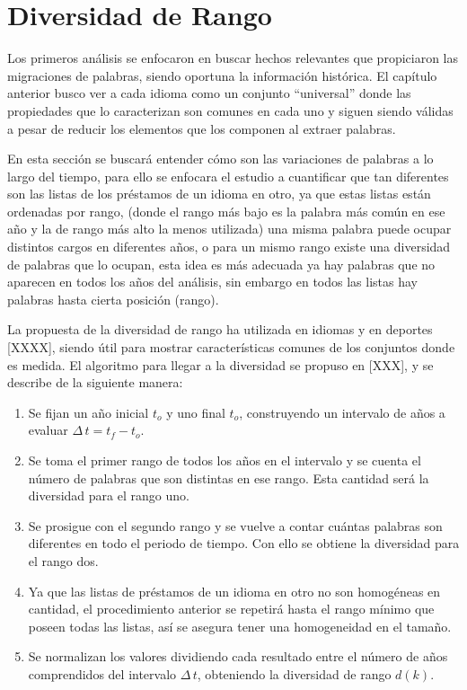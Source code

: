 \chapter{Diversidad de Rango}

Los primeros análisis se enfocaron en buscar hechos relevantes que propiciaron las migraciones de palabras,  siendo oportuna la información histórica.  El capítulo anterior busco ver a cada idioma como un conjunto “universal” donde las propiedades que lo caracterizan  son comunes en cada uno y siguen siendo válidas a pesar de reducir los elementos que los componen al extraer palabras. 

En esta sección se buscará entender cómo son las variaciones de palabras a  lo largo del tiempo, para ello  se enfocara el estudio a cuantificar que tan diferentes son las listas de los préstamos de un idioma en otro,  ya que estas listas están ordenadas por rango, (donde el rango más bajo es la palabra más común en ese año y la de rango más alto la menos utilizada)  una misma palabra puede ocupar distintos cargos en diferentes años,  o  para un mismo rango existe una diversidad de palabras que lo ocupan, esta idea es más adecuada ya hay palabras que no  aparecen en todos los años del análisis,  sin embargo en todos las listas  hay palabras hasta cierta posición (rango).   

La propuesta de la diversidad de rango ha utilizada en idiomas y en deportes [XXXX], siendo útil para mostrar características comunes de los conjuntos donde es medida.  El algoritmo para llegar a la diversidad se propuso en [XXX], y se describe de la siguiente manera:


\begin{enumerate}
	
	\item Se fijan un año inicial $t_{o}$ y uno final $t_{o}$, construyendo un intervalo de años a evaluar $\Delta\,t = t_{f}- t_{o}$.
	
	\item Se toma el primer rango de todos los años en el intervalo y se cuenta el número de palabras que son distintas en ese rango. Esta cantidad será la diversidad para el rango uno.
	
	\item Se prosigue con el segundo rango y se vuelve a contar cuántas palabras son diferentes en todo el periodo de tiempo.  Con ello se obtiene la diversidad para el rango dos. 
	
	\item Ya que las listas de préstamos de un idioma en otro no son homogéneas en cantidad, el procedimiento anterior se repetirá hasta el rango mínimo que poseen todas las listas,  así se asegura tener una homogeneidad en el tamaño.
	
	\item Se normalizan  los valores dividiendo cada resultado entre el número de años comprendidos del intervalo $\Delta\,t$, obteniendo  la diversidad de rango $d(k)$.
	
	
\end{enumerate}


